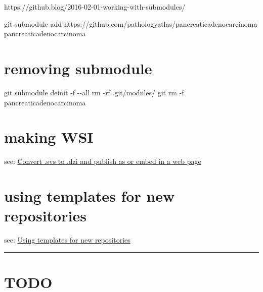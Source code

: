 \documentclass[
  letterpaper,
  DIV=11,
  numbers=noendperiod]{scrreprt}
\newenvironment{Shaded}{}{}
\newcommand{\AttributeTok}[1]{\textcolor[rgb]{0.49,0.56,0.16}{#1}}
\newcommand{\FunctionTok}[1]{\textcolor[rgb]{0.02,0.16,0.49}{#1}}
\newcommand{\NormalTok}[1]{#1}
\begin{document}
https://github.blog/2016-02-01-working-with-submodules/

\begin{Shaded}
\begin{Highlighting}[]
\FunctionTok{git}\NormalTok{ submodule add https://github.com/pathologyatlas/pancreaticadenocarcinoma pancreaticadenocarcinoma}
\end{Highlighting}
\end{Shaded}

\hypertarget{removing-submodule}{%
\chapter{removing submodule}\label{removing-submodule}}

\begin{Shaded}
\begin{Highlighting}[]
\FunctionTok{git}\NormalTok{ submodule deinit }\AttributeTok{{-}f} \AttributeTok{{-}{-}all}
\FunctionTok{rm} \AttributeTok{{-}rf}\NormalTok{ .git/modules/}
\FunctionTok{git}\NormalTok{ rm }\AttributeTok{{-}f}\NormalTok{ pancreaticadenocarcinoma}
\end{Highlighting}
\end{Shaded}

\hypertarget{making-wsi}{%
\chapter{making WSI}\label{making-wsi}}

see:
\href{https://github.com/pathologyatlas/make-html-WSI\#convert-svs-to-dzi-and-publish-as-or-embed-in-a-web-page}{Convert
.svs to .dzi and publish as or embed in a web page}

\hypertarget{using-templates-for-new-repositories}{%
\chapter{using templates for new
repositories}\label{using-templates-for-new-repositories}}

see: \href{https://github.com/pathologyatlas/template}{Using templates
for new repositories}

\begin{center}\rule{0.5\linewidth}{0.5pt}\end{center}

\hypertarget{todo}{%
\chapter{TODO}\label{todo}}
\end{document}
